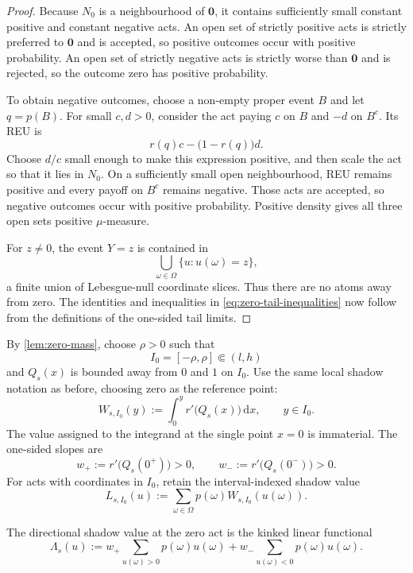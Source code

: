 \documentclass[11pt,a4paper]{article}
\theoremstyle{definition}
\newcommand{\dd}{\,\mathrm d}
\newcommand{\zero}{\mathbf 0}
\begin{document}
\begin{proof}
Because $N_0$ is a neighbourhood of $\zero$, it contains sufficiently small
constant positive and constant negative acts. An open set of strictly positive
acts is strictly preferred to $\zero$ and is accepted, so positive outcomes
occur with positive probability. An open set of strictly negative acts is
strictly worse than $\zero$ and is rejected, so the outcome zero has positive
probability.

To obtain negative outcomes, choose a non-empty proper event $B$ and let
$q=p(B)$. For small $c,d>0$, consider the act paying $c$ on $B$ and $-d$ on
$B^c$. Its REU is
\[
 r(q)c-\bigl(1-r(q)\bigr)d.
\]
Choose $d/c$ small enough to make this expression positive, and then scale the
act so that it lies in $N_0$. On a sufficiently small open neighbourhood, REU
remains positive and every payoff on $B^c$ remains negative. Those acts are
accepted, so negative outcomes occur with positive probability. Positive
density gives all three open sets positive $\mu$-measure.

For $z\neq0$, the event $Y=z$ is contained in
\[
 \bigcup_{\omega\in\Omega}\{u:u(\omega)=z\},
\]
a finite union of Lebesgue-null coordinate slices. Thus there are no atoms
away from zero. The identities and inequalities in
\eqref{eq:zero-tail-inequalities} now follow from the definitions of the
one-sided tail limits.
\end{proof}

By \cref{lem:zero-mass}, choose $\rho>0$ such that
\[
 I_0=[-\rho,\rho]\Subset(l,h)
\]
and $Q_s(x)$ is bounded away from $0$ and $1$ on $I_0$. Use the same local
shadow notation as before, choosing zero as the reference point:
\begin{equation}\label{eq:zero-shadow}
 W_{s,I_0}(y):=\int_0^y r'\bigl(Q_s(x)\bigr)\dd x,
 \qquad y\in I_0.
\end{equation}
The value assigned to the integrand at the single point $x=0$ is immaterial.
The one-sided slopes are
\begin{equation}\label{eq:one-sided-slopes}
 w_+:=r'\bigl(Q_s(0^+)\bigr)>0,
 \qquad
 w_-:=r'\bigl(Q_s(0^-)\bigr)>0.
\end{equation}
For acts with coordinates in $I_0$, retain the interval-indexed shadow value
\[
 L_{s,I_0}(u):=\sum_{\omega\in\Omega}p(\omega)W_{s,I_0}(u(\omega)).
\]

The directional shadow value at the zero act is the kinked linear functional
\begin{equation}\label{eq:kinked-functional}
 \Lambda_s(u)
 :=w_+\sum_{u(\omega)>0}p(\omega)u(\omega)
  +w_-\sum_{u(\omega)<0}p(\omega)u(\omega).
\end{equation}
\end{document}
